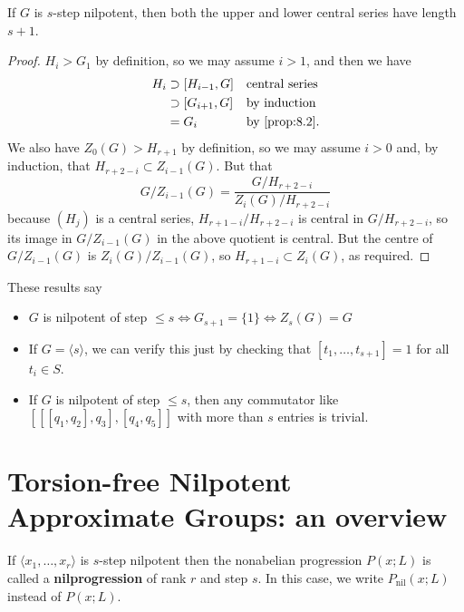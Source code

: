 \documentclass{article}
\newcommand{\named}[1]{\textbf{#1}\index{#1}}
\numberwithin{equation}{section}
\begin{document}
\begin{ncor}\label{cor:8.6}
  If $G$ is $s$-step nilpotent, then both the upper and lower central series have length $s+1$.
\end{ncor}
\begin{proof}
  $H_i > G_1$ by definition, so we may assume $i>1$, and then we have
  \begin{align*}
    H_i &\supset [H_{i-1},G] &&\text{central series} \\
        &\supset [G_{i+1},G] &&\text{by induction} \\
        &=G_i &&\text{by \cref{prop:8.2}}.
  \end{align*}
  We also have $Z_0(G) > H_{r+1}$ by definition, so we may assume $i > 0$ and, by induction, that $H_{r+2-i} \subset Z_{i-1}(G)$.
  But that
  \begin{equation*}
    G/Z_{i-1}(G) = \frac{G/H_{r+2-i}}{Z_i(G)/H_{r+2-i}}
  \end{equation*}
  because $(H_j)$ is a central series, $H_{r+1-i}/H_{r+2-i}$ is central in $G/H_{r+2-i}$, so its image in $G/Z_{i-1}(G)$ in the above quotient is central.
  But the centre of $G/Z_{i-1}(G)$ is $Z_i(G)/Z_{i-1}(G)$, so $H_{r+1-i} \subset Z_i(G)$, as required.
\end{proof}

These results say
\begin{itemize}
  \item $G$ is nilpotent of step $\leq s \iff G_{s+1} = \{1\} \iff Z_s(G) = G$
  \item If $G = \langle s \rangle$, we can verify this just by checking that $[t_1, \dotsc, t_{s+1}] = 1$ for all $t_i \in S$.
  \item If $G$ is nilpotent of step $\leq s$, then any commutator like $[[[q_1, q_2], q_3], [q_4, q_5]]$ with more than $s$ entries is trivial.
\end{itemize}

\clearpage
\section{Torsion-free Nilpotent Approximate Groups: an overview}
\begin{defi}
  \newlec
  If $\langle x_1, \dotsc, x_r \rangle$ is $s$-step nilpotent then the nonabelian progression $P(x;L)$ is called a \named{nilprogression} of rank $r$ and step $s$.
  In this case, we write $P_{\text{nil}}(x;L)$ instead of $P(x;L)$.
\end{defi}
\end{document}

